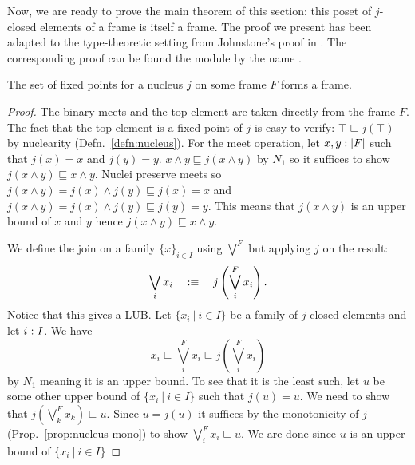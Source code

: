 Now, we are ready to prove the main theorem of this section: this poset of $j$-closed
elements of a frame is itself a frame. The proof we present has been adapted to the
type-theoretic setting from Johnstone's proof in \cite[II.2.2, pg.~49]{stone-spaces}. The
corresponding \veragda{} proof can be found the  module by the name
.

\begin{thm}\label{thm:fixed-point-frame}
  The set of fixed points for a nucleus $j$ on some frame $F$ forms a frame.
\end{thm}
\begin{proof}
  The binary meets and the top element are taken directly from the frame $F$. The fact
  that the top element is a fixed point of $j$ is easy to verify: $\top \sqsubseteq j(\top)$ by nuclearity
  (Defn.~\ref{defn:nucleus}). For the meet operation, let $x, y:\left| F \right|$ such
  that $j(x) = x$ and $j(y) = y$. $x \wedge y \sqsubseteq j(x \wedge y)$ by $N_1$ so it suffices to show $j(x
  \wedge y) \sqsubseteq x \wedge y$. Nuclei preserve meets so $j(x \wedge y) = j(x) \wedge j(y) \sqsubseteq j(x) = x$ and $j(x \wedge
  y) = j(x) \wedge j(y) \sqsubseteq j(y) = y$. This means that $j(x \wedge y)$ is an upper bound of $x$ and
  $y$ hence $j(x \wedge y) \sqsubseteq x \wedge y$.

  We define the join on a family $\{ x \}_{i \in I}$ using $\bigvee^F$ but applying $j$ on the
  result:
  \begin{equation*}
    \bigvee_i x_i \quad:\equiv\quad j \left( \bigvee^F_i x_i \right).
  \end{equation*}
  Notice that this gives a LUB. Let $\{ x_i ~|~ i \in I \}$ be a family of $j$-closed
  elements and let $i\hspace{0.1mm}:\hspace{0.1mm}I$. We have
  \begin{equation*}
    x_i \sqsubseteq \bigvee^F_i x_i \sqsubseteq j\left( \bigvee^F_i x_i \right)
  \end{equation*}
  by $N_1$ meaning it is an upper bound. To see that it is the least such, let $u$ be some
  other upper bound of $\{ x_i ~|~ i \in I \}$ such that $j(u) = u$. We need to show that $j
  \left( \bigvee^F_k x_k \right) \sqsubseteq u$. Since $u = j(u)$ it suffices by the monotonicity of $j$
  (Prop.~\ref{prop:nucleus-mono}) to show $\bigvee^F_i x_i \sqsubseteq u$. We are done since $u$ is an
  upper bound of $\{ x_i ~|~ i \in I \}$


\end{proof}
